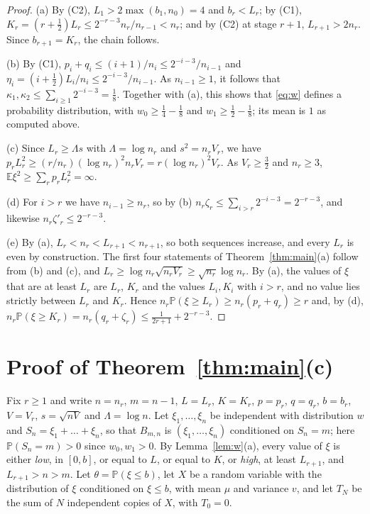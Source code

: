 \documentclass[11pt]{amsart}
\numberwithin{equation}{section}
\newcommand{\Pp}{\mathbb P}
\newcommand{\E}{\mathbb E}
\begin{document}
\begin{proof}
(a) By (C2), $L_1>2\max(b_1,n_0)=4$ and $b_r<L_r$; by (C1), $K_r=(r+\frac12)L_r\le2^{-r-3}n_r/n_{r-1}<n_r$; and by (C2) at stage $r+1$, $L_{r+1}>2n_r$. Since $b_{r+1}=K_r$, the chain follows.

(b) By (C1), $p_i+q_i\le(i+1)/n_i\le2^{-i-3}/n_{i-1}$ and $\eta_i=(i+\frac12)L_i/n_i\le2^{-i-3}/n_{i-1}$. As $n_{i-1}\ge1$, it follows that $\kappa_1,\kappa_2\le\sum_{i\ge1}2^{-i-3}=\frac18$. Together with (a), this shows that \eqref{eq:w} defines a probability distribution, with $w_0\ge\frac14-\frac18$ and $w_1\ge\frac12-\frac18$; its mean is $1$ as computed above.

(c) Since $L_r\ge\Lambda s$ with $\Lambda=\log n_r$ and $s^2=n_rV_r$, we have $p_rL_r^2\ge(r/n_r)(\log n_r)^2n_rV_r=r(\log n_r)^2V_r$. As $V_r\ge\frac32$ and $n_r\ge3$, $\E\xi^2\ge\sum_rp_rL_r^2=\infty$.

(d) For $i>r$ we have $n_{i-1}\ge n_r$, so by (b) $n_r\zeta_r\le\sum_{i>r}2^{-i-3}=2^{-r-3}$, and likewise $n_r\zeta'_r\le2^{-r-3}$.

(e) By (a), $L_r<n_r<L_{r+1}<n_{r+1}$, so both sequences increase, and every $L_r$ is even by construction. The first four statements of Theorem~\ref{thm:main}(a) follow from (b) and (c), and $L_r\ge\log n_r\sqrt{n_rV_r}\ge\sqrt{n_r}\log n_r$. By (a), the values of $\xi$ that are at least $L_r$ are $L_r$, $K_r$ and the values $L_i,K_i$ with $i>r$, and no value lies strictly between $L_r$ and $K_r$. Hence $n_r\Pp(\xi\ge L_r)\ge n_r(p_r+q_r)\ge r$ and, by (d), $n_r\Pp(\xi\ge K_r)=n_r(q_r+\zeta_r)\le\frac1{2r+1}+2^{-r-3}$.
\end{proof}

\section{Proof of Theorem~\ref{thm:main}(c)}\label{sec:proof}

Fix $r\ge1$ and write $n=n_r$, $m=n-1$, $L=L_r$, $K=K_r$, $p=p_r$, $q=q_r$, $b=b_r$, $V=V_r$, $s=\sqrt{nV}$ and $\Lambda=\log n$. Let $\xi_1,\dots,\xi_n$ be independent with distribution $w$ and $S_n=\xi_1+\dots+\xi_n$, so that $B_{m,n}$ is $(\xi_1,\dots,\xi_n)$ conditioned on $S_n=m$; here $\Pp(S_n=m)>0$ since $w_0,w_1>0$. By Lemma~\ref{lem:w}(a), every value of $\xi$ is either \emph{low}, in $[0,b]$, or equal to $L$, or equal to $K$, or \emph{high}, at least $L_{r+1}$, and $L_{r+1}>n>m$. Let $\theta=\Pp(\xi\le b)$, let $X$ be a random variable with the distribution of $\xi$ conditioned on $\xi\le b$, with mean $\mu$ and variance $v$, and let $T_N$ be the sum of $N$ independent copies of $X$, with $T_0=0$.
\end{document}
